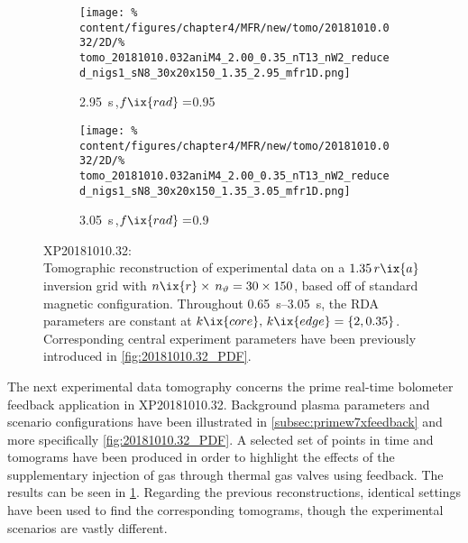 \begin{figure}[t]
                \begin{subfigure}{0.45\textwidth}%
                    \centering%
                    \caption{\SI{2.95}{\second}\,,$f\ix{rad}=$\SI{0.95}{\arbitraryunit}}%
                    \texttt{[image: \%
                        content/figures/chapter4/MFR/new/tomo/20181010.032/2D/\%
                        tomo\_20181010.032aniM4\_2.00\_0.35\_nT13\_nW2\_reduced\_nigs1\_sN8\_30x20x150\_1.35\_2.95\_mfr1D.png]}%
                    \end{subfigure}%
                \hfill%
                \begin{subfigure}{0.45\textwidth}%
                    \centering%
                    \caption{\SI{3.05}{\second}\,,$f\ix{rad}=$\SI{0.9}{\arbitraryunit}}%
                    \texttt{[image: \%
                        content/figures/chapter4/MFR/new/tomo/20181010.032/2D/\%
                        tomo\_20181010.032aniM4\_2.00\_0.35\_nT13\_nW2\_reduced\_nigs1\_sN8\_30x20x150\_1.35\_3.05\_mfr1D.png]}%
                \end{subfigure}%
                \caption{%
                    XP20181010.32:\\%
                    Tomographic reconstruction of experimental data on a $1.35\,r\ix{a}$ inversion grid with $n\ix{r}\times\,n_{\vartheta}=30\times150$, based off of standard magnetic configuration. Throughout \SIrange{0.65}{3.05}{\second}, the RDA parameters are constant at $k\ix{core},\,k\ix{edge}=\left\{2, 0.35\right\}$. Corresponding central experiment parameters have been previously introduced in \cref{fig:20181010.32_PDF}.}\label{fig:tomo_20181010.32_times}%
            \end{figure}%
%
            The next experimental data tomography concerns the prime real-time bolometer feedback application in XP20181010.32. Background plasma parameters and scenario configurations have been illustrated in \cref{subsec:primew7xfeedback} and more specifically \cref{fig:20181010.32_PDF}. A selected set of points in time and tomograms have been produced in order to highlight the effects of the supplementary injection of gas through thermal gas valves using feedback. The results can be seen in \cref{fig:tomo_20181010.32_times}. Regarding the previous reconstructions, identical settings have been used to find the corresponding tomograms, though the experimental scenarios are vastly different.\\%
